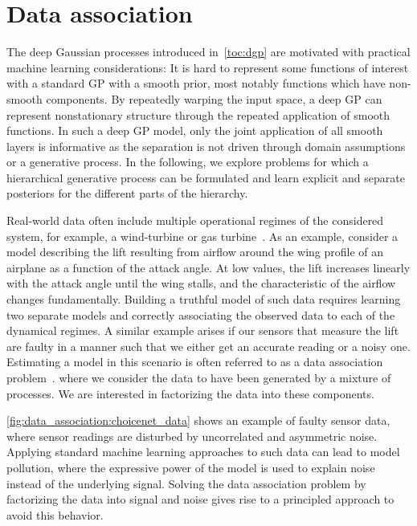 \chapter{Data association}
\label{toc:data_association}
The deep Gaussian processes introduced in~\cref{toc:dgp} are motivated with practical machine learning considerations:
It is hard to represent some functions of interest with a standard GP with a smooth prior, most notably functions which have non-smooth components.
By repeatedly warping the input space, a deep GP can represent nonstationary structure through the repeated application of smooth functions.
In such a deep GP model, only the joint application of all smooth layers is informative as the separation is not driven through domain assumptions or a generative process.
In the following, we explore problems for which a hierarchical generative process can be formulated and learn explicit and separate posteriors for the different parts of the hierarchy.

Real-world data often include multiple operational regimes of the considered system, for example, a wind-turbine or gas turbine~\parencite{hein_benchmark_2017}.
As an example, consider a model describing the lift resulting from airflow around the wing profile of an airplane as a function of the attack angle.
At low values, the lift increases linearly with the attack angle until the wing stalls, and the characteristic of the airflow changes fundamentally.
Building a truthful model of such data requires learning two separate models and correctly associating the observed data to each of the dynamical regimes.
A similar example arises if our sensors that measure the lift are faulty in a manner such that we either get an accurate reading or a noisy one.
Estimating a model in this scenario is often referred to as a data association problem~\parencite{barshalom_tracking_1990,cox_review_1993}. where we consider the data to have been generated by a mixture of processes.
We are interested in factorizing the data into these components.

\cref{fig:data_association:choicenet_data} shows an example of faulty sensor data, where sensor readings are disturbed by uncorrelated and asymmetric noise.
Applying standard machine learning approaches to such data can lead to model pollution, where the expressive power of the model is used to explain noise instead of the underlying signal.
Solving the data association problem by factorizing the data into signal and noise gives rise to a principled approach to avoid this behavior.

